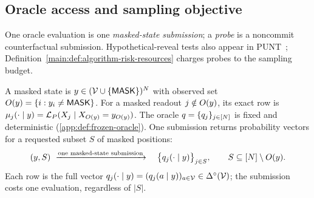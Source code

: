 \subsection{Oracle access and sampling objective}
\label{sec:main-oracle}

One oracle evaluation is one \emph{masked-state submission}; a
\emph{probe} is a noncommit counterfactual submission.
Hypothetical-reveal tests also appear in PUNT~\citep{azangulov2025parallel};
Definition~\ref{main:def:algorithm-risk-resources} charges probes to the sampling budget.

\begin{definition}
\label{main:def:frozen-oracle}
A masked state is $y\in(\Vocab\cup\{\MASK\})^N$ with observed set
$\ObservedSet{y}=\{i:y_i\ne\MASK\}$.
For a masked readout $j\notin\ObservedSet{y}$, its exact row is
$\ExactRow{y}{j}
 =\mathcal L_{\TargetLaw}(X_j\mid
 X_{\ObservedSet{y}}=y_{\ObservedSet{y}})$.
\begingroup\color{red}
The oracle $\FrozenOracle=\{\FrozenOracle_j\}_{j\in\PositionSet}$ is fixed
and deterministic (\cref{app:def:frozen-oracle}). One submission returns
probability vectors for a requested subset $S$ of masked positions:
\[
 (y,S)\ \xrightarrow{\text{one masked-state submission}}\quad
 \bigl\{\OracleRow{y}{j}\bigr\}_{j\in S},
 \qquad S\subseteq\PositionSet\setminus\ObservedSet{y}.
\]
Each row is the full vector
$\OracleRow{y}{j}=(\OracleRowMass{y}{j}{a})_{a\in\Vocab}\in\Delta^\circ(\Vocab)$;
the submission costs one evaluation, regardless of $|S|$.
\endgroup
\end{definition}


